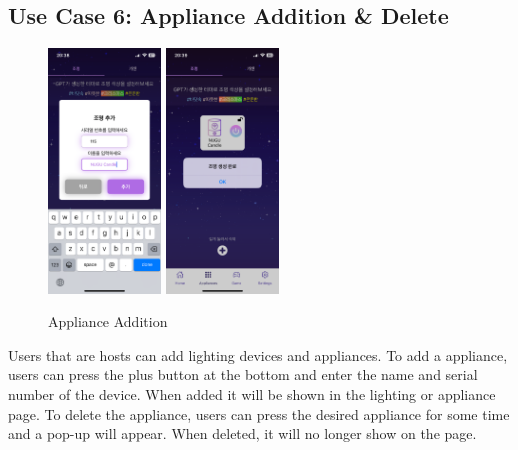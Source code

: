 \documentclass[conference]{IEEEtran}
\begin{document}
    \subsection{Use Case 6: Appliance Addition \& Delete}
        \begin{figure}[htbp]
            \centerline{\includegraphics[width=3cm]{Images/screen/light/3_LIGHT_ADD_FILLED.PNG}
            \includegraphics[width=3cm]{Images/screen/light/4_LIGHT_ADD_ALERT.PNG}}
            \caption{Appliance Addition}
            \label{fig}
        \end{figure}
        Users that are hosts can add lighting devices and appliances. To add a appliance, users can press the plus button at the bottom and enter the name and serial number of the device. When added it will be shown in the lighting or appliance page. To delete the appliance, users can press the desired appliance for some time and a pop-up will appear. When deleted, it will no longer show on the page.
\end{document}
